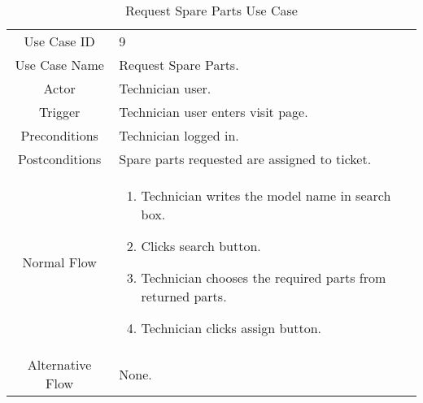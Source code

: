 	\begin{table}[H]
		\centering
		\renewcommand{\arraystretch}{1.5}
		\begin{tabular}[t]{ c  m{10cm} }
			Use Case ID & 9  \\
			Use Case Name & Request Spare Parts. \\
			Actor & Technician user. \\
			Trigger & Technician user enters visit page. \\
			Preconditions & Technician logged in. \\
			Postconditions & Spare parts requested are assigned to ticket. \\
			Normal Flow &\begin{enumerate}
				\item Technician writes the model name in search box.
				\item Clicks search button.
				\item Technician chooses the required parts from returned parts.
				\item Technician clicks assign button.
			\end{enumerate}\\
			Alternative Flow & None. \\
		\end{tabular}
		\caption{Request Spare Parts Use Case}
		\renewcommand{\arraystretch}{1.0}
	\end{table}
	
